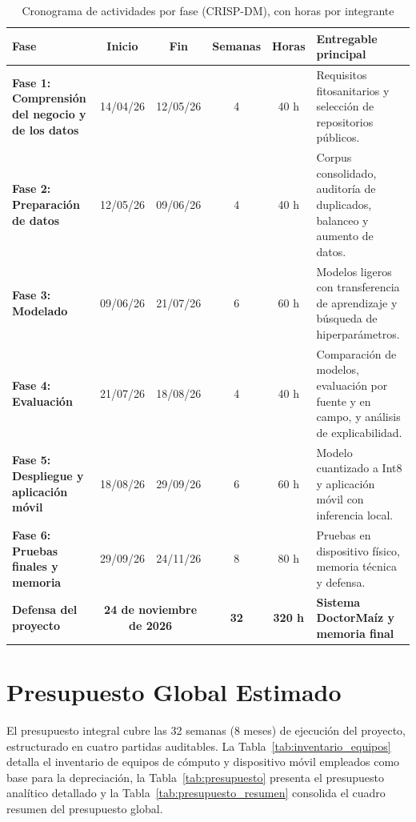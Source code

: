 \begin{table}[H]
\caption{Cronograma de actividades por fase (CRISP-DM), con horas por integrante}
\label{tab:cronograma}
\centering
\footnotesize
\begin{singlespace}
\setlength{\tabcolsep}{3.5pt}
\begin{tabularx}{\textwidth}{p{4.2cm}ccccX}
\toprule
\textbf{Fase} & \textbf{Inicio} & \textbf{Fin} & \textbf{Semanas} & \textbf{Horas} & \textbf{Entregable principal} \\
\midrule
\textbf{Fase 1: Comprensi\'on del negocio y de los datos} & 14/04/26 & 12/05/26 & 4 & 40 h & Requisitos fitosanitarios y selecci\'on de repositorios p\'ublicos. \\
\textbf{Fase 2: Preparaci\'on de datos} & 12/05/26 & 09/06/26 & 4 & 40 h & Corpus consolidado, auditor\'ia de duplicados, balanceo y aumento de datos. \\
\textbf{Fase 3: Modelado} & 09/06/26 & 21/07/26 & 6 & 60 h & Modelos ligeros con transferencia de aprendizaje y b\'usqueda de hiperpar\'ametros. \\
\textbf{Fase 4: Evaluaci\'on} & 21/07/26 & 18/08/26 & 4 & 40 h & Comparaci\'on de modelos, evaluaci\'on por fuente y en campo, y an\'alisis de explicabilidad. \\
\textbf{Fase 5: Despliegue y aplicaci\'on m\'ovil} & 18/08/26 & 29/09/26 & 6 & 60 h & Modelo cuantizado a Int8 y aplicaci\'on m\'ovil con inferencia local. \\
\textbf{Fase 6: Pruebas finales y memoria} & 29/09/26 & 24/11/26 & 8 & 80 h & Pruebas en dispositivo f\'isico, memoria t\'ecnica y defensa. \\
\midrule
\textbf{Defensa del proyecto} & \multicolumn{2}{c}{\textbf{24 de noviembre de 2026}} & \textbf{32} & \textbf{320 h} & \textbf{Sistema DoctorMa\'iz y memoria final} \\
\bottomrule
\end{tabularx}
\end{singlespace}
\end{table}

\section{Presupuesto Global Estimado}

El presupuesto integral cubre las 32 semanas (8 meses) de ejecuci\'on del proyecto, estructurado en cuatro partidas auditables. La Tabla~\ref{tab:inventario_equipos} detalla el inventario de equipos de c\'omputo y dispositivo m\'ovil empleados como base para la depreciaci\'on, la Tabla~\ref{tab:presupuesto} presenta el presupuesto anal\'itico detallado y la Tabla~\ref{tab:presupuesto_resumen} consolida el cuadro resumen del presupuesto global.

